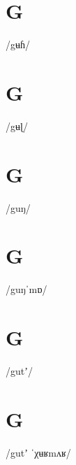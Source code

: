 \documentclass[10pt,a4paper,twoside]{book}
\begin{document}
\section*{G}

\begin{multicols}{3}
 {/gʉɦ/} {}
\end{multicols}

\section*{G}

\begin{multicols}{3}
 {/gʉɭ/} {}
\end{multicols}

\section*{G}

\begin{multicols}{3}
 {/guŋ/} {}
\end{multicols}

\section*{G}

\begin{multicols}{3}
 {/guŋˈmɒ/} {}
\end{multicols}

\section*{G}

\begin{multicols}{3}
 {/gutʼ/} {}
\end{multicols}

\section*{G}

\begin{multicols}{3}
 {/gutʼ ˈχʉʁmʌʁ/} {}
\end{multicols}
\end{document}

